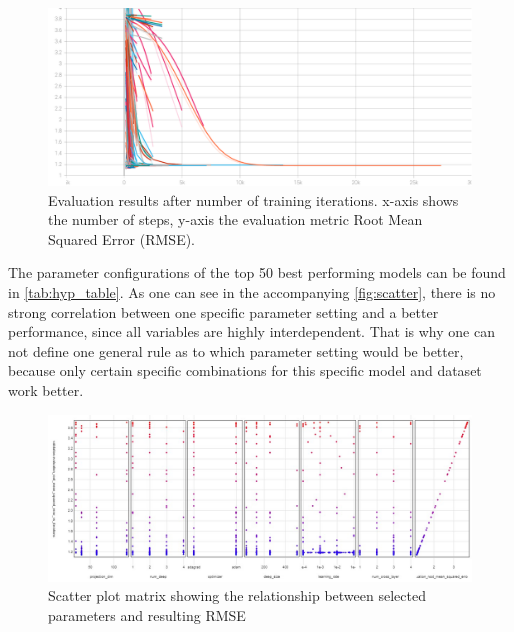 \documentclass[10pt,final,journal,a4paper,oneside,twocolumn]{IEEEtran}
\begin{document}
\begin{figure}[ht]
    \centering
    \includegraphics[width=\linewidth]{hp_tuning_20220_evaluation_root_mean_squared_error_vs_iterations.pdf}
    \caption{Evaluation results after number of training iterations. x-axis shows the number of steps, y-axis the evaluation metric Root Mean Squared Error (RMSE).}
    \label{fig:rmse_it}
\end{figure}

The parameter configurations of the top 50 best performing models can be found in \autoref{tab:hyp_table}. As one can see in the accompanying \autoref{fig:scatter}, there is no strong correlation between one specific parameter setting and a better performance, since all variables are highly interdependent. That is why one can not define one general rule as to which parameter setting would be better, because only certain specific combinations for this specific model and dataset work better.

\begin{figure}[ht]
    \centering
    \includegraphics[width=\linewidth]{hparam_scatter.jpg}
    \caption{Scatter plot matrix showing the relationship between selected parameters and resulting RMSE}
    \label{fig:scatter}
\end{figure}
\end{document}
